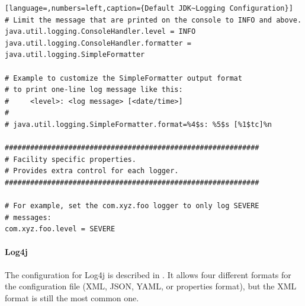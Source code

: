 \documentclass[11pt,a4paper, titlepage, parskip=half, headsepline, footsepline, cleardoublepage=current, headheight=1cm]{scrbook}
\begin{document}
\begin{lstlisting}[language=,numbers=left,caption={Default JDK~Logging Configuration}]
# Limit the message that are printed on the console to INFO and above.
java.util.logging.ConsoleHandler.level = INFO
java.util.logging.ConsoleHandler.formatter = java.util.logging.SimpleFormatter

# Example to customize the SimpleFormatter output format 
# to print one-line log message like this:
#     <level>: <log message> [<date/time>]
#
# java.util.logging.SimpleFormatter.format=%4$s: %5$s [%1$tc]%n

############################################################
# Facility specific properties.
# Provides extra control for each logger.
############################################################

# For example, set the com.xyz.foo logger to only log SEVERE
# messages:
com.xyz.foo.level = SEVERE
\end{lstlisting}

\autocite{ORACLE_DOC_LOGGING_PACKAGE,ORACLE_DOC_LOGGING_OVERVIEW}

\paragraph{Log4j} The configuration for Log4j is described in \autocite{APACHE_LOG4J:Configuration}. It allows four different formats for the configuration file (XML, JSON, YAML, or properties format), but the XML format is still the most common one.
\end{document}

